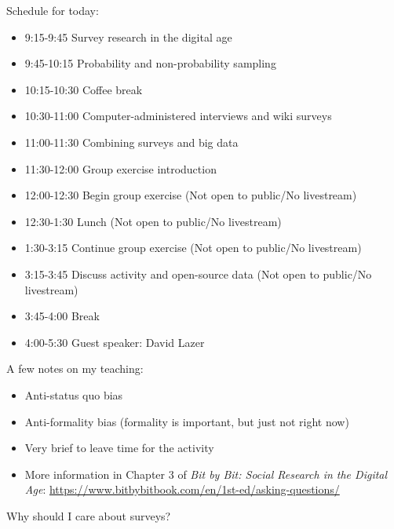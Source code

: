 \documentclass[aspectratio=169]{beamer}
\begin{document}
\begin{frame}

Schedule for today: 
\begin{itemize}
\item 9:15-9:45 Survey research in the digital age
\item  9:45-10:15 Probability and non-probability sampling 
\item 10:15-10:30 Coffee break
\item 10:30-11:00 Computer-administered interviews and wiki surveys 
\item 11:00-11:30 Combining surveys and big data 
\item 11:30-12:00 Group exercise introduction
\item 12:00-12:30 Begin group exercise (Not open to public/No livestream)
\item 12:30-1:30 Lunch (Not open to public/No livestream)
\item 1:30-3:15 Continue group exercise (Not open to public/No livestream)
\item 3:15-3:45 Discuss activity and open-source data (Not open to public/No livestream)
\item 3:45-4:00 Break
\item 4:00-5:30 Guest speaker: David Lazer
\end{itemize}

\end{frame}
\begin{frame}

A few notes on my teaching:
\begin{itemize}
\item Anti-status quo bias
\pause
\item Anti-formality bias (formality is important, but just not right now)
\pause
\item Very brief to leave time for the activity
\pause
\item More information in Chapter 3 of \textit{Bit by Bit: Social Research in the Digital Age}: \url{https://www.bitbybitbook.com/en/1st-ed/asking-questions/}
\end{itemize}

\end{frame}
\begin{frame}

\begin{center}
\LARGE{Why should I care about surveys?}
\end{center}

\end{frame}
\end{document}
